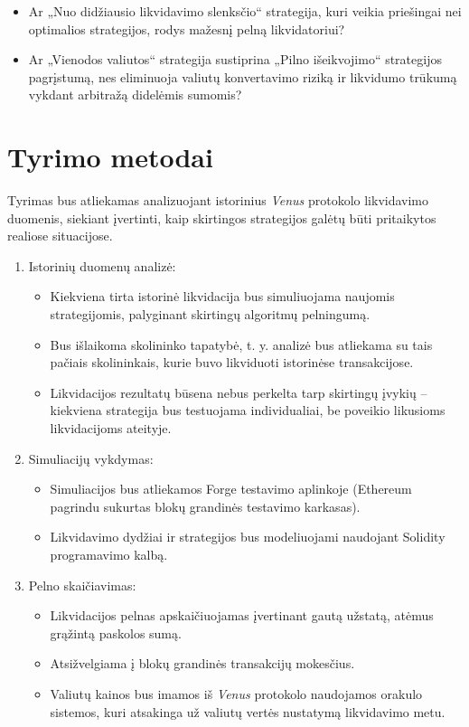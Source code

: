 \documentclass[]{VUMIFTemplateClass}
\begin{document}
\begin{enumerate}
\begin{itemize}
    \item Ar „Nuo didžiausio likvidavimo slenksčio“ strategija, kuri veikia priešingai nei optimalios strategijos, rodys mažesnį pelną likvidatoriui?
    \item Ar „Vienodos valiutos“ strategija sustiprina „Pilno išeikvojimo“ strategijos pagrįstumą, nes eliminuoja valiutų konvertavimo riziką ir likvidumo trūkumą vykdant arbitražą didelėmis sumomis?
  \end{itemize}
\end{enumerate}

\section{Tyrimo metodai}

Tyrimas bus atliekamas analizuojant istorinius \textit{Venus} protokolo likvidavimo duomenis, siekiant įvertinti, kaip skirtingos strategijos galėtų būti pritaikytos realiose situacijose.

\begin{enumerate}
  \item Istorinių duomenų analizė:
  \begin{itemize}
    \item Kiekviena tirta istorinė likvidacija bus simuliuojama naujomis strategijomis, palyginant skirtingų algoritmų pelningumą.
    \item Bus išlaikoma skolininko tapatybė, t. y. analizė bus atliekama su tais pačiais skolininkais, kurie buvo likviduoti istorinėse transakcijose.
    \item Likvidacijos rezultatų būsena nebus perkelta tarp skirtingų įvykių – kiekviena strategija bus testuojama individualiai, be poveikio likusioms likvidacijoms ateityje.
  \end{itemize}

  \item Simuliacijų vykdymas:
  \begin{itemize}
    \item Simuliacijos bus atliekamos Forge testavimo aplinkoje (Ethereum pagrindu sukurtas blokų grandinės testavimo karkasas).
    \item Likvidavimo dydžiai ir strategijos bus modeliuojami naudojant Solidity programavimo kalbą.
  \end{itemize}

  \item Pelno skaičiavimas:
  \begin{itemize}
    \item Likvidacijos pelnas apskaičiuojamas įvertinant gautą užstatą, atėmus grąžintą paskolos sumą.
    \item Atsižvelgiama į blokų grandinės transakcijų mokesčius.
    \item Valiutų kainos bus imamos iš \textit{Venus} protokolo naudojamos orakulo sistemos, kuri atsakinga už valiutų vertės nustatymą likvidavimo metu.
  \end{itemize}
\end{enumerate}
\end{document}
